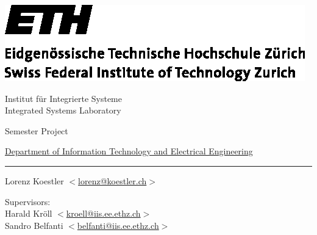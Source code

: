 \begin{center}

  \vspace*{-2cm}
  \begin{minipage}{\textwidth}
    \begin{minipage}{68mm}
      \includegraphics{ethlogo}
    \end{minipage} \hfill
    \begin{minipage}{50mm}
      \vspace{8.7mm}
      \begin{flushright}
         {\footnotesize Institut f\" ur Integrierte Systeme\\
          \vspace{-0.75mm} Integrated Systems Laboratory}
      \end{flushright}
    \end{minipage}
  \end{minipage}

  \vspace{3cm}

  \begin{flushright}
    {\LARGE Semester Project}\\
    \vspace{5mm}

    \href{http://www.ee.ethz.ch}{Department of Information Technology and Electrical Engineering}


    \vspace{1.5cm} {\LARGE \bfseries \mytitle}
    \rule{\textwidth}{0.8mm}

    \vspace{2cm}

    Lorenz Koestler $ < $\href{mailto:lorenz@koestler.ch}{lorenz@koestler.ch}$ > $ \\

    \vspace{4cm}

    \myterm

    \vspace{2cm}
    Supervisors: \\
    Harald Kr\" oll $ < $\href{mailto:kroell@iis.ee.ethz.ch}{kroell@iis.ee.ethz.ch}$ > $ \\
    Sandro Belfanti $ < $\href{mailto:belfanti@iis.ee.ethz.ch}{belfanti@iis.ee.ethz.ch}$ > $

  \end{flushright}
\end{center}
\newpage
